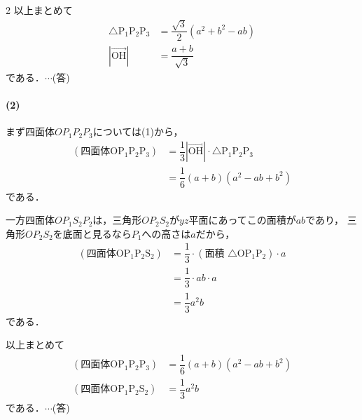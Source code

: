 \documentclass[../../main.tex]{subfiles}
\begin{document}
\begin{multicols}{2}
  以上まとめて
  \begin{align}
    \triangle \text{P}_1\text{P}_2\text{P}_3 & = \dfrac{\sqrt{3}}{2} \left(a^2+b^2-ab\right) \\
    |\overrightarrow{\text{OH}}|                        & = \dfrac{a+b}{\sqrt{3}}
  \end{align}
  である．$\cdots$(答)

  \paragraph{(2)}
  まず四面体$OP_1P_2P_3$については(1)から，
  \begin{align}
    (\text{四面体}\text{OP}_1\text{P}_2\text{P}_3)
    & = \dfrac{1}{3} |\overrightarrow{\text{OH}}| \cdot \triangle \text{P}_1\text{P}_2\text{P}_3 \\
    & = \dfrac{1}{6} \left(a+b\right)\left(a^2-ab+b^2\right)
  \end{align}
  である．

  一方四面体$OP_1S_2P_2$は，三角形$OP_2S_2$が$yz$平面にあってこの面積が$ab$であり，
  三角形$OP_2S_2$を底面と見るなら$P_1$への高さは$a$だから，
  \begin{align}
    (\text{四面体}\text{OP}_1\text{P}_2\text{S}_2)
    & = \dfrac{1}{3} \cdot (\text{面積 } \triangle \text{OP}_1\text{P}_2) \cdot a \\
    & = \dfrac{1}{3} \cdot ab \cdot a                                           \\
    & = \dfrac{1}{3} a^2b
  \end{align}
  である．

  以上まとめて
  \begin{align}
    (\text{四面体}\text{OP}_1\text{P}_2\text{P}_3) & =\dfrac{1}{6} (a+b)\left(a^2-ab+b^2\right) \\
    (\text{四面体}\text{OP}_1\text{P}_2\text{S}_2) & = \dfrac{1}{3} a^2b
  \end{align}
  である．$\cdots$(答)


\end{multicols}
\end{document}
